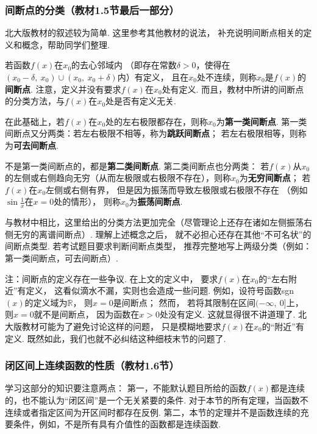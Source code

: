 \subsubsection{间断点的分类（教材1.5节最后一部分）}\par
北大版教材的叙述较为简单.
这里参考其他教材的说法，
补充说明间断点相关的定义和概念，帮助同学们整理. \par

若函数$f(x)$在$x_{0}$的去心邻域内
（即存在常数$\delta>0$，使得在$(x_{0}-\delta,~x_{0})\cup(x_{0},~x_{0}+\delta)$内）有定义，
且在$x_{0}$处不连续，则称$x_{0}$是$f(x)$的\textbf{间断点}. 注意，定义并没有要求$f(x)$在$x_{0}$处有定义. 而且，教材中所讲的间断点的分类方法，与$f(x)$在$x_{0}$处是否有定义无关.\par

在此基础上，若$f(x)$在$x_{0}$处的左右极限都存在，则称$x_{0}$为\textbf{第一类间断点}. 第一类间断点又分两类：若左右极限不相等，称为\textbf{跳跃间断点}；
若左右极限相等，则称为\textbf{可去间断点}.

不是第一类间断点的，都是\textbf{第二类间断点}. 第二类间断点也分两类：
若$f(x)$从$x_{0}$的左侧或右侧趋向无穷（从而左极限或右极限不存在），则称$x_{0}$为\textbf{无穷间断点}；
若$f(x)$在$x_{0}$左侧或右侧有界，
但是因为振荡而导致左极限或右极限不存在
（例如$\sin \frac{1}{x}$在$x=0$处的情形），
则称$x_{0}$为\textbf{振荡间断点}.

与教材中相比，这里给出的分类方法更加完全（尽管理论上还存在诸如左侧振荡右侧无穷的离谱间断点）.
理解上述概念之后，
就不必担心还存在其他“不可名状”的间断点类型.
若考试题目要求判断间断点类型，
推荐完整地写上两级分类（例如：第一类间断点，可去间断点）.\vspace{0.5em}

注：间断点的定义存在一些争议.
在上文的定义中，
要求$f(x)$在$x_{0}$的“左右附近”有定义，
这看似滴水不漏，实则也会造成一些问题.
例如，设符号函数sgn$(x)$的定义域为$\mathbb{R}$，
则$x=0$是间断点；
然而，
若将其限制在区间$(-\infty,~0]$上，
则$x=0$就不是间断点，
因为函数在$x>0$处没有定义.
这就显得很不讲道理了.
北大版教材可能为了避免讨论这样的问题，
只是模糊地要求$f(x)$在$x_{0}$的“附近”有定义.
既然如此，我们也就不必纠结这种细枝末节的问题了.

\subsubsection{闭区间上连续函数的性质（教材1.6节）}\par
学习这部分的知识要注意两点：
第一，不能默认题目所给的函数$f(x)$都是连续的，也不能认为“闭区间”是一个无关紧要的条件.
对于本节的所有定理，当函数不连续或者指定区间为开区间时都存在反例.
第二，本节的定理并不是函数连续的充要条件，例如，不是所有具有介值性的函数都是连续函数. \vspace{0.5em}

